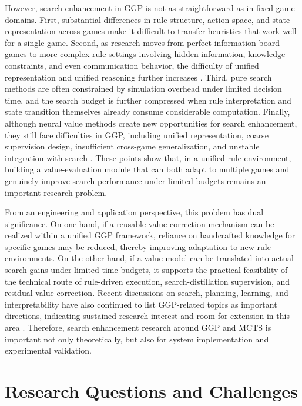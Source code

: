 However, search enhancement in GGP is not as straightforward as in fixed game domains. First, substantial differences in rule structure, action space, and state representation across games make it difficult to transfer heuristics that work well for a single game. Second, as research moves from perfect-information board games to more complex rule settings involving hidden information, knowledge constraints, and even communication behavior, the difficulty of unified representation and unified reasoning further increases \cite{partridge2022hidden,zammit2023communication}. Third, pure search methods are often constrained by simulation overhead under limited decision time, and the search budget is further compressed when rule interpretation and state transition themselves already consume considerable computation. Finally, although neural value methods create new opportunities for search enhancement, they still face difficulties in GGP, including unified representation, coarse supervision design, insufficient cross-game generalization, and unstable integration with search \cite{goldwaser2020deep,mcewan2022knowledge,maras2024fast}. These points show that, in a unified rule environment, building a value-evaluation module that can both adapt to multiple games and genuinely improve search performance under limited budgets remains an important research problem.

From an engineering and application perspective, this problem has dual significance. On one hand, if a reusable value-correction mechanism can be realized within a unified GGP framework, reliance on handcrafted knowledge for specific games may be reduced, thereby improving adaptation to new rule environments. On the other hand, if a value model can be translated into actual search gains under limited time budgets, it supports the practical feasibility of the technical route of rule-driven execution, search-distillation supervision, and residual value correction. Recent discussions on search, planning, learning, and interpretability have also continued to list GGP-related topics as important directions, indicating sustained research interest and room for extension in this area \cite{soemers2024gametable}. Therefore, search enhancement research around GGP and MCTS is important not only theoretically, but also for system implementation and experimental validation.

\section{Research Questions and Challenges}

